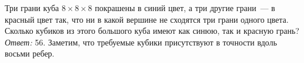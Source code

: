 \problem
Три грани куба $8 \times 8 \times 8$ покрашены в синий цвет, а три другие
грани~--- в красный цвет так, что ни в какой вершине не сходятся три грани
одного цвета.
Сколько кубиков из этого большого куба имеют как синюю, так и красную грань?
\solution
\emph{Ответ:} 56.
Заметим, что требуемые кубики присутствуют в точности вдоль восьми ребер.
\endproblem
